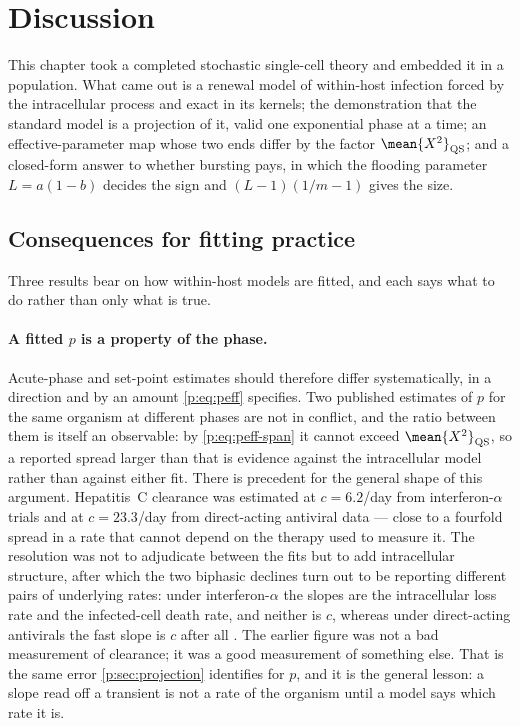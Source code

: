 \section{Discussion}
\label{p:sec:discussion}

This chapter took a completed stochastic single-cell theory and embedded it
in a population. What came out is a renewal model of within-host infection
forced by the intracellular process and exact in its kernels; the
demonstration that the standard model is a projection of it, valid one
exponential phase at a time; an effective-parameter map whose two ends
differ by the factor $\mean{X^2}_{\rm QS}$; and a closed-form answer to
whether bursting pays, in which the flooding parameter $L=a(1-b)$ decides
the sign and $(L-1)(1/m-1)$ gives the size.

\subsection{Consequences for fitting practice}
\label{p:sec:fitting-consequences}

Three results bear on how within-host models are fitted, and each says what
to do rather than only what is true.

\paragraph{A fitted $p$ is a property of the phase.} Acute-phase and
set-point estimates should therefore differ systematically, in a direction
and by an amount \cref{p:eq:peff} specifies. Two published estimates of $p$
for the same organism at different phases are not in conflict, and the ratio
between them is itself an observable: by \cref{p:eq:peff-span} it cannot
exceed $\mean{X^2}_{\rm QS}$, so a reported spread larger than that is
evidence against the intracellular model rather than against either fit.
There is precedent for the general shape of this argument. Hepatitis~C
clearance was estimated at $c=6.2$/day from interferon-$\alpha$ trials
\cite{neumann1998hepatitis} and at $c=23.3$/day from direct-acting antiviral
data \cite{guedj2013modeling} --- close to a fourfold spread in a rate that
cannot depend on the therapy used to measure it. The resolution was not to
adjudicate between the fits but to add intracellular structure, after which
the two biphasic declines turn out to be reporting different pairs of
underlying rates: under interferon-$\alpha$ the slopes are the intracellular
loss rate and the infected-cell death rate, and neither is $c$, whereas
under direct-acting antivirals the fast slope is $c$ after all
\cite{rong2013mathematical}. The earlier figure was not a bad measurement of
clearance; it was a good measurement of something else. That is the same
error \cref{p:sec:projection} identifies for $p$, and it is the general
lesson: a slope read off a transient is not a rate of the organism until a
model says which rate it is.

